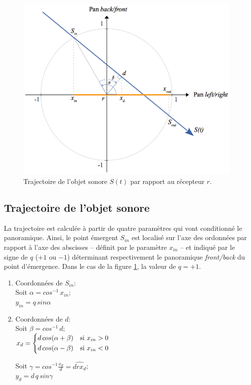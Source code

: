 \begin{figure}[H]
\begin{center}
\includegraphics[scale=0.33]{img/4782}
\caption{Trajectoire de l'objet sonore $S(t)$ par rapport au r\'ecepteur $r$. }
\label{tra}
\end{center}
\end{figure}

\subsection*{Trajectoire de l'objet sonore}

La trajectoire est calcul\'ee \`a partir de quatre param\`etres qui vont conditionn\'e le panoramique. Ainsi, le point \'emergent $S_{in}$ est localis\'e  sur l'axe des ordonn\'ees par rapport \`a l'axe des abscisses -- d\'efinit par le param\`etre $x_{in}$ -- et indiqu\'e par le signe de $q$  ($+1$ ou $-1$) d\'eterminant respectivement le panoramique \textit{front/back} du point d'\'emergence. Dans le cas de la figure \ref{tra}, la valeur de  $q=+1$.%

\begin{enumerate}
\item Coordonn\'ees de $S_{in}$:\\  
Soit $\alpha = cos^{-1} \,x_{in}$;\\
$y_{in}=q\, sin \alpha$
\item Coordonn\'ees de $d$:\\ 
Soit $\beta = cos^{-1} \, d$;\\

$
   x_{d}=
\begin{dcases}
    d\, cos(\alpha + \beta)& \text{si } x_{in}>0\\
    d\, cos(\alpha - \beta)& \text{si } x_{in}<0
\end{dcases}
$

 Soit $\gamma =cos^{-1} \displaystyle \frac{x_d}{d}=\widehat{drx_d}$;\\
 $y_d=d\, q \,sin \gamma$
 \end{enumerate}
 
